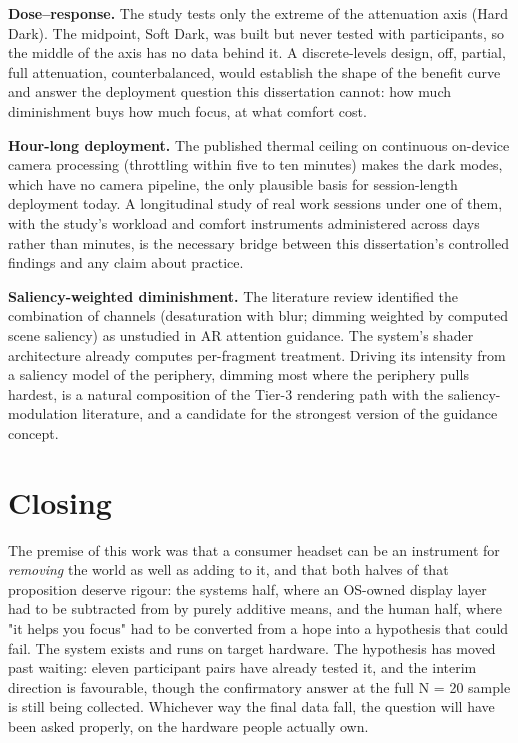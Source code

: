 \textbf{Dose–response.} The study tests only the extreme of the attenuation axis (Hard Dark). The
midpoint, Soft Dark, was built but never tested with participants, so the middle of the axis has no
data behind it. A discrete-levels design, off, partial,
full attenuation, counterbalanced, would establish the shape of the benefit curve and answer the
deployment question this dissertation cannot: how much diminishment buys how much focus, at what
comfort cost.

\textbf{Hour-long deployment.} The published thermal ceiling on continuous on-device camera processing
(throttling within five to ten minutes) makes the dark modes, which have no camera pipeline, the
only plausible basis for session-length deployment today. A longitudinal study of real work sessions
under one of them, with the study's workload and comfort instruments administered across days rather
than minutes, is the necessary bridge between this dissertation's controlled findings and any claim
about practice.

\textbf{Saliency-weighted diminishment.} The literature review identified the combination of channels
(desaturation with blur; dimming weighted by computed scene saliency) as unstudied in AR attention
guidance. The system's shader architecture already computes per-fragment treatment. Driving its
intensity from a saliency model of the periphery, dimming most where the periphery pulls hardest,
is a natural composition of the Tier-3 rendering path with the saliency-modulation literature, and a
candidate for the strongest version of the guidance concept.

\section{Closing}

The premise of this work was that a consumer headset can be an instrument for \textit{removing} the world as
well as adding to it, and that both halves of that proposition deserve rigour: the systems half,
where an OS-owned display layer had to be subtracted from by purely additive means, and the human
half, where "it helps you focus" had to be converted from a hope into a hypothesis that could fail.
The system exists and runs on target hardware. The hypothesis has moved past waiting: eleven
participant pairs have already tested it, and the interim direction is favourable, though the
confirmatory answer at the full N = 20 sample is still being collected. Whichever way the final data
fall, the question will have been asked properly, on the hardware people actually own.
